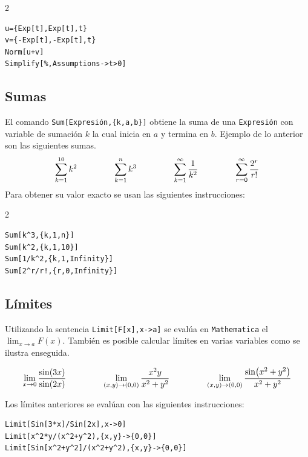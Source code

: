     \begin{tcolorbox}
      \begin{multicols}{2}
\begin{Verbatim}[formatcom=\letraverbatim]
u={Exp[t],Exp[t],t}
v={-Exp[t],-Exp[t],t}
Norm[u+v]
Simplify[%,Assumptions->t>0]
\end{Verbatim}
      \end{multicols}
    \end{tcolorbox}

    \subsection{Sumas}
    El comando \verb"Sum[Expresión,{k,a,b}]" obtiene la suma de una \verb"Expresión"
    con variable de sumación $k$ la cual inicia en $a$ y termina en $b$.
    Ejemplo de lo anterior son las siguientes sumas.
    $$\sum_{k=1}^{10} k^2 \hskip1.5cm
    \sum_{k=1}^n k^3 \hskip1.5cm
    \sum_{k=1}^\infty \frac{1}{k^2} \hskip1.5cm
    \sum_{r=0}^\infty \frac{2^r}{r!}$$
    Para obtener su valor exacto se usan las siguientes instrucciones:

    \begin{tcolorbox}[title=Funciones \verb"Mathematica"]
      \begin{multicols}{2} %
\begin{Verbatim}[formatcom=\letraverbatim]
Sum[k^3,{k,1,n}]
Sum[k^2,{k,1,10}]
Sum[1/k^2,{k,1,Infinity}]
Sum[2^r/r!,{r,0,Infinity}]
\end{Verbatim}
      \end{multicols}
    \end{tcolorbox}

    \subsection{Límites}
    Utilizando la sentencia \verb"Limit[F[x],x->a]" se evalúa en \verb"Mathematica" el $\lim_{x\to a} F(x)$.
    También es posible calcular límites en varias variables como se ilustra enseguida.

    {\small $$\lim_{x\to0}\frac{\sin(3x)}{\sin(2x)}\hskip1.5cm
      \lim_{(x,y)\to (0,0)}\frac{x^2y}{x^2+y^2} \hskip1.5cm
    \lim_{(x,y)\to(0,0)}\frac{\sin(x^2+y^2)}{x^2+y^2}$$}

    Los límites anteriores se evalúan con las siguientes instrucciones:
    \begin{tcolorbox}
\begin{Verbatim}[formatcom=\letraverbatim]
Limit[Sin[3*x]/Sin[2x],x->0]
Limit[x^2*y/(x^2+y^2),{x,y}->{0,0}]
Limit[Sin[x^2+y^2]/(x^2+y^2),{x,y}->{0,0}]
\end{Verbatim}
    \end{tcolorbox}


